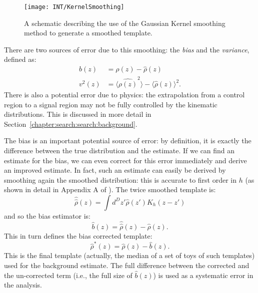 
\begin{figure}
\centering
\texttt{[image: INT/KernelSmoothing]}
\label{fig:search:substructure:smoothing}
\caption{A schematic describing the use of the Gaussian Kernel smoothing method to generate a smoothed template.}
\end{figure}


There are two sources of error due to this smoothing: the \textit{bias} and the \textit{variance}, defined as:
%
\begin{align}
b(z) &= \rho(z) - \hat{\rho}(z)\nonumber\\
v^2(z) &= \langle \hat{\rho(z)}^2 \rangle  - \langle \hat{\rho}(z) \rangle^2.
\end{align}
%
There is also a potential error due to  physics: the extrapolation from a control region to a signal region may not be fully controlled by the kinematic distributions. This is discussed in more detail in Section~\ref{chapter:search:search:background}. 

The bias is an important potential source of error: by definition, it is exactly the difference between the true distribution and the estimate. If we can find an estimate for the bias, we can even correct for this error immediately and derive an improved estimate. In fact, such an estimate can easily be derived by smoothing again the smoothed distribution: this is accurate to first order in $h$ (as shown in detail in Appendix A of \cite{MassTemplates}). The twice smoothed template is:
%
\begin{equation}
\hat{\hat{\rho}}(z) = \int d^D z' \hat{\rho}(z') K_h (z-z')
\end{equation}
% 
and so the bias estimator is:
%
\begin{equation}
\hat{b}(z) = \hat{\hat{\rho}}(z) - \hat{\rho}(z).
\end{equation}
%
This in turn defines the bias corrected template:
%
\begin{equation}
\hat{\rho}^*(z) = \hat{\rho}(z) - \hat{b}(z).
\end{equation}
%
This is the final template (actually, the median of a set of toys of such templates) used for the background estimate. The full difference between the corrected and the un-corrected term (i.e., the full size of $\hat{b}(z)$) is used as a systematic error in the analysis.

